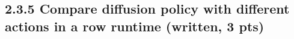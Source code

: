 \documentclass[12pt]{article}
\begin{document}
\subsection*{2.3.5 Compare diffusion policy with different actions in a row runtime (written, 3 pts)}
\begin{tcolorbox}[fit,height=10em, width=40em, blank, borderline={1pt}{1pt},nobeforeafter]
            \begin{center}
            \begin{solution}

            \end{solution}
            \end{center}
            \end{tcolorbox}

\clearpage
\end{document}
